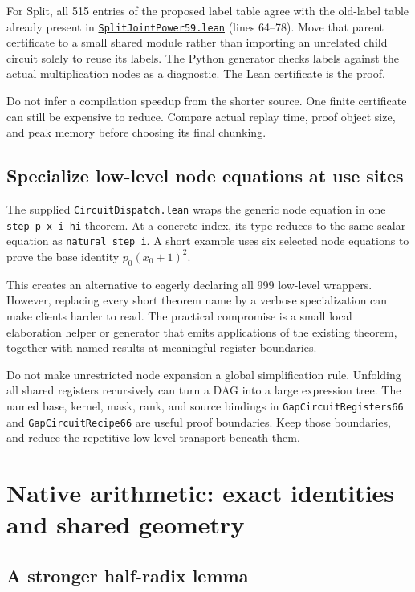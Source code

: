\documentclass[11pt,letterpaper]{article}
\newcommand{\code}[1]{\nolinkurl{#1}}
\newcommand{\src}[2]{\href{https://github.com/VladimirReshetnikov/ProveIt/blob/60e9c5d620c6c387d932876cfa2d9376f64ea56c/Computability/DiophantineConsistency/Lean/DiophantineConsistency/#1.lean}{\nolinkurl{#1.lean}} (lines #2)}
\begin{document}
For Split, all 515 entries of the proposed label table agree with the
old-label table already present in
\src{SplitJointPower59}{64--78}. Move that parent certificate to a small
shared module rather than importing an unrelated child circuit solely to
reuse its labels. The Python generator checks labels against the actual
multiplication nodes as a diagnostic. The Lean certificate is the proof.

Do not infer a compilation speedup from the shorter source. One finite
certificate can still be expensive to reduce. Compare actual replay time,
proof object size, and peak memory before choosing its final chunking.

\subsection{Specialize low-level node equations at use sites}

The supplied \code{CircuitDispatch.lean} wraps the generic node equation
in one \code{step p x i hi} theorem. At a concrete index, its type reduces
to the same scalar equation as \code{natural_step_i}. A short example
uses six selected node equations to prove the base identity
\(p_0(x_0+1)^2\).

This creates an alternative to eagerly declaring all 999 low-level
wrappers. However, replacing every short theorem name by a verbose
specialization can make clients harder to read. The practical compromise
is a small local elaboration helper or generator that emits applications
of the existing theorem, together with named results at meaningful
register boundaries.

Do not make unrestricted node expansion a global simplification rule.
Unfolding all shared registers recursively can turn a DAG into a large
expression tree. The named base, kernel, mask, rank, and source bindings
in \code{GapCircuitRegisters66} and \code{GapCircuitRecipe66} are useful
proof boundaries. Keep those boundaries, and reduce the repetitive
low-level transport beneath them.

\section{Native arithmetic: exact identities and shared geometry}

\subsection{A stronger half-radix lemma}
\end{document}
